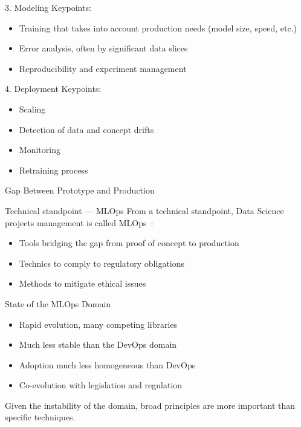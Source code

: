 \begin{frame}{3. Modeling}
  Keypoints:
  \begin{itemize}
    \item Training that takes into account production needs (model size, speed, etc.)
    \item Error analysis, often by significant data slices
    \item Reproducibility and experiment management
  \end{itemize}
\end{frame}

\begin{frame}{4. Deployment}
  Keypoints:
  \begin{itemize}
    \item Scaling
    \item Detection of data and concept drifts
    \item Monitoring
    \item Retraining process
  \end{itemize}
\end{frame}

\begin{frame}{Gap Between Prototype and Production}
\end{frame}

\begin{frame}{Technical standpoint — MLOps}
  From a technical standpoint, Data Science projects management is called MLOps~:

  \begin{itemize}
    \item Tools bridging the gap from proof of concept to production
    \item Technics to comply to regulatory obligations
    \item Methods to mitigate ethical issues
  \end{itemize}
\end{frame}

\begin{frame}{State of the MLOps Domain}
  \begin{itemize}
    \item Rapid evolution, many competing libraries
    \item Much less stable than the DevOps domain
    \item Adoption much less homogeneous than DevOps
    \item Co-evolution with legislation and regulation
  \end{itemize}
  Given the instability of the domain, broad principles are more important than specific techniques.
\end{frame}